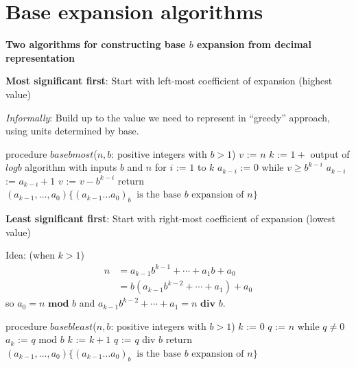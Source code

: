 \documentclass[12pt, oneside]{article}
\begin{document}
\section*{Base expansion algorithms}


{\bf Two algorithms for constructing base $b$ expansion from decimal representation}

{\bf Most significant first}: Start with left-most coefficient of expansion (highest value)

{\it Informally}: Build up to the value we need to represent in ``greedy'' approach, using 
units determined by base.

\vfill




\begin{algorithm}[caption={Calculating base $b$ expansion, from left}]
procedure $\textit{basebmost}$($n, b$: positive integers with $b > 1$)
$v$ := $n$
$k$ := $1 + $ output of $logb$ algorithm with inputs $b$ and $n$
for $i$ := $1$ to $k$
  $a_{k-i}$ := $0$
  while $v \geq b^{k-i}$
    $a_{k-i}$ := $a_{k-i} + 1$
    $v$ := $v -  b^{k-i}$
return $(a_{k-1}, \ldots, a_0) \{(a_{k-1} \ldots a_0)_b~\textrm{ is the base } b \textrm{ expansion of } n \}$
\end{algorithm}
 


\vfill
\vfill

\newpage
{\bf Least significant first}: Start with right-most coefficient of expansion (lowest value)

Idea: {\tiny(when $k > 1$)} 
    \begin{align*}
      n &= a_{k-1} b^{k-1} + \cdots + a_1 b + a_0 \\
        &= b ( a_{k-1} b^{k-2} + \cdots + a_1) + a_0\end{align*}
    so $a_0 = n \textbf{ mod } b$ and $a_{k-1} b^{k-2} + \cdots + a_1 = n \textbf{ div } b$.




\begin{algorithm}[caption={Calculating base $b$ expansion, from right}]
procedure $\textit{basebleast}$($n, b$: positive integers with $b > 1$)
$k$ := $0$
$q$ := $n$
while $q  \neq 0$
  $a_{k}$ := $q$ mod $b$
  $k$ := $k+1$
  $q$ := $q$ div $b$
return $(a_{k-1}, \ldots, a_0) \{(a_{k-1} \ldots a_0)_b~\textrm{ is the base } b \textrm{ expansion of } n \}$
\end{algorithm}
 



\vfill
\vfill
\newpage \vfill
\end{document}
